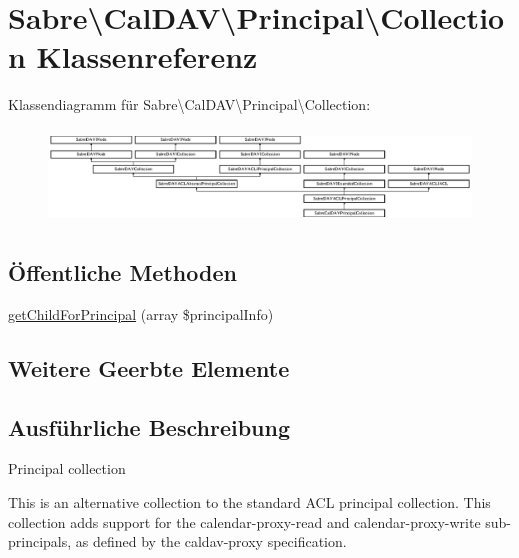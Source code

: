 \hypertarget{class_sabre_1_1_cal_d_a_v_1_1_principal_1_1_collection}{}\section{Sabre\textbackslash{}Cal\+D\+AV\textbackslash{}Principal\textbackslash{}Collection Klassenreferenz}
\label{class_sabre_1_1_cal_d_a_v_1_1_principal_1_1_collection}
Klassendiagramm für Sabre\textbackslash{}Cal\+D\+AV\textbackslash{}Principal\textbackslash{}Collection\+:\begin{figure}[H]
\begin{center}
\leavevmode
\includegraphics[height=2.516854cm]{class_sabre_1_1_cal_d_a_v_1_1_principal_1_1_collection}
\end{center}
\end{figure}
\subsection*{Öffentliche Methoden}
\begin{DoxyCompactItemize}
\item 
\mbox{\hyperlink{class_sabre_1_1_cal_d_a_v_1_1_principal_1_1_collection_a1f164ea204f072db4c8b421ffa3f33df}{get\+Child\+For\+Principal}} (array \$principal\+Info)
\end{DoxyCompactItemize}
\subsection*{Weitere Geerbte Elemente}


\subsection{Ausführliche Beschreibung}
Principal collection

This is an alternative collection to the standard A\+CL principal collection. This collection adds support for the calendar-\/proxy-\/read and calendar-\/proxy-\/write sub-\/principals, as defined by the caldav-\/proxy specification.

